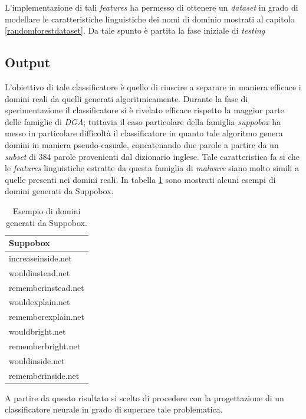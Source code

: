 L'implementazione di tali \textit{features} ha permesso di ottenere un \textit{dataset} in grado di modellare le caratteristiche linguistiche dei nomi di dominio mostrati al capitolo \ref{randomforestdataset}. Da tale spunto è partita la fase iniziale di \textit{testing} 

\subsection{Output}
\label{randomforestoutput}
L'obiettivo di tale classificatore è quello di riuscire a separare in maniera efficace i domini reali da quelli generati algoritmicamente. Durante la fase di sperimentazione il classificatore si è rivelato efficace rispetto la maggior parte delle famiglie di \textit{DGA}; tuttavia il caso particolare della famiglia \textit{suppobox} \cite{geffner2013end} ha messo in particolare difficoltà il classificatore in quanto tale algoritmo genera domini in maniera pseudo-casuale, concatenando due parole a partire da un \textit{subset} di 384 parole provenienti dal dizionario inglese. Tale caratteristica fa si che le \textit{features} linguistiche estratte da questa famiglia di \textit{malware} siano molto simili a quelle presenti nei domini reali. In tabella \ref{tab:suppobox} sono mostrati alcuni esempi di domini generati da Suppobox.


\begin{table}[htb]
    \centering
    \begin{tabular}{|l|}
        \hline
        Suppobox
        \\
        \hline
        \hline
       	increaseinside.net \\
		wouldinstead.net \\
		rememberinstead.net \\
		wouldexplain.net \\
		rememberexplain.net \\
		wouldbright.net \\
		rememberbright.net \\
		wouldinside.net \\
		rememberinside.net \\
        \hline
    \end{tabular}
    \caption{Esempio di domini generati da Suppobox.}
\label{tab:suppobox}
\end{table}

A partire da questo risultato si scelto di procedere con la progettazione di un classificatore neurale in grado di superare tale problematica.


